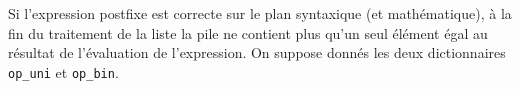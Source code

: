 Si l’expression postfixe est correcte sur le plan syntaxique (et mathématique), à la fin du traitement de la liste la
pile ne contient plus qu’un seul élément égal au résultat de l’évaluation de l’expression.
On suppose donnés les deux dictionnaires \texttt{op\_uni} et \texttt{op\_bin}.


